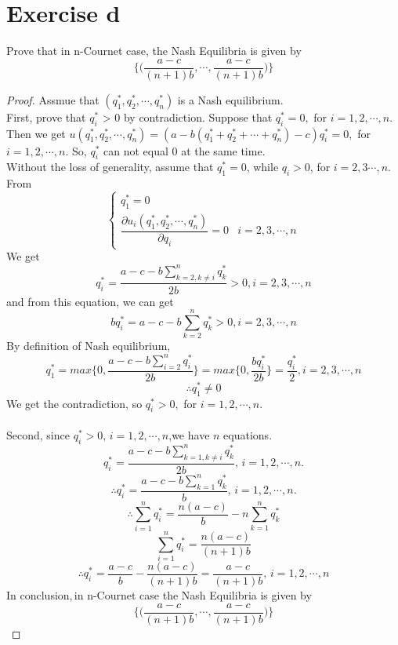 \documentclass[a4papers]{ctexart}
\begin{document}
\section*{Exercise d}
\noindent Prove that in n-Cournet case, the Nash Equilibria is given by
\[ \Big\{ \Big(\dfrac{a-c}{(n+1)b},\cdots,\dfrac{a-c}{(n+1)b}  \Big) \Big\} \]

\begin{proof}
 Assmue that $(q_1^*,q_2^*,\cdots,q_n^*)$ is a Nash equilibrium.\\
First, prove that $q_i^*$ > 0 by contradiction. Suppose that $q_i^* = 0,$ for $i=1,2,\cdots,n$.
Then we get $u(q_1^*,q_2^*,\cdots,q_n^*)=(a-b(q_1^*+q_2^*+\cdots+q_n^*)-c)q_i^* =0,$ for $i=1,2,\cdots,n$.
So, $q_i^*$ can not equal 0 at the same time.\\
Without the loss of generality, assume that $q_1^*=0$, while $q_i > 0$, for $i=2,3\cdots,n$.\\
From
\begin{equation*}
    \begin{cases}
        q_1^* = 0 \\
        \dfrac{\partial u_i(q_1^*,q_2^*,\cdots,q_n^*)}{\partial q_i} = 0 & i=2,3,\cdots,n
    \end{cases}
\end{equation*}
We get \[q_i^* = \dfrac{a-c-b\sum_{k=2,k\ne i}^{n}q_k^*}{2b} > 0,i=2,3,\cdots,n \]
and from this equation, we can get\[bq_i^* = a-c-b \sum_{k=2}^{n}q_k^* > 0,i=2,3,\cdots,n \]
By definition of Nash equilibrium, 
\[ q_1^* = max \Big\{ 0,\dfrac{a-c-b\sum_{i=2}^{n}q_i^*}{2b} \Big\} = max\Big\{ 0,\dfrac{bq_i^*}{2b}\Big\} = \dfrac{q_i^*}{2}, i=2,3,\cdots,n \]
\[\therefore q_1^* \ne 0\]
We get the contradiction, so $q_i^* > 0,$ for $i=1,2,\cdots,n.$
\\ \\ 
Second, since $q_i^* > 0,\,i=1,2,\cdots,n$,we have $n$ equations.
\[ q_i^* = \dfrac{a-c-b\sum_{k=1,k\ne i}^{n}q_k^*}{2b},\, i=1,2,\cdots,n.\]
\[ \therefore q_i^* = \dfrac{a-c-b\sum_{k=1}^{n}q_k^*}{b},\, i=1,2,\cdots,n.\]
\[ \therefore \sum_{i=1}^{n} q_i^*= \dfrac{n(a-c)}{b} - n\sum_{k=1}^{n}q_k^* \]
\[ \sum_{i=1}^{n} q_i^* = \dfrac{n(a-c)}{(n+1)b}\]
\[ \therefore q_i^* = \dfrac{a-c}{b}-\dfrac{n(a-c)}{(n+1)b}=\dfrac{a-c}{(n+1)b},\,i=1,2,\cdots,n  \]
In conclusion,\,in n-Cournet case the Nash Equilibria is given by
\[ \Big\{ \Big(\dfrac{a-c}{(n+1)b},\cdots,\dfrac{a-c}{(n+1)b}  \Big) \Big\} \]
\end{proof}
\end{document}

